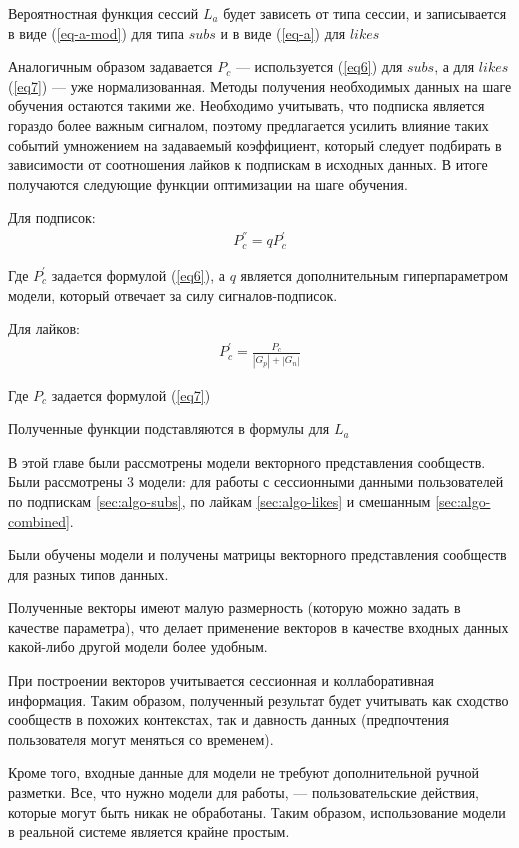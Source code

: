 \documentclass[times,specification,annotation]{itmo-student-thesis}
\begin{document}
Вероятностная функция сессий $L_a$ будет зависеть от типа сессии, и записывается в виде (\ref{eq-a-mod}) для типа $subs$ и в виде (\ref{eq-a}) для $likes$

Аналогичным образом задавается $P_c$ --- используется (\ref{eq6}) для $subs$, а для $likes$ (\ref{eq7}) --- уже нормализованная. Методы получения необходимых данных на шаге обучения остаются такими же. Необходимо учитывать, что подписка является гораздо более важным сигналом, поэтому предлагается усилить влияние таких событий умножением на задаваемый коэффициент, который следует подбирать в зависимости от соотношения лайков к подпискам в исходных данных. В итоге получаются следующие функции оптимизации на шаге обучения.

Для подписок:
\begin{align*}
P^{''}_c = qP^{'}_c
\end{align*}

Где $P^{'}_c$ задаeтся формулой  (\ref{eq6}), а $q$ является дополнительным гиперпараметром модели, который отвечает за силу сигналов-подписок. 

Для лайков:
\begin{align*}
P^{'}_c = \frac{P_c}{|G_p| +|G_n|} 
\end{align*}

Где $P_c$ задается формулой  (\ref{eq7})

Полученные функции подставляются в формулы для $L_a$

\chapterconclusion

В этой главе были рассмотрены модели векторного представления сообществ. Были рассмотрены 3 модели: для работы с сессионными данными пользователей по подпискам \ref{sec:algo-subs}, по лайкам \ref{sec:algo-likes} и смешанным \ref{sec:algo-combined}.

Были обучены модели и получены матрицы векторного представления сообществ для разных типов данных. 

Полученные векторы имеют малую размерность (которую можно задать в качестве параметра), что
делает применение векторов в качестве входных данных какой-либо другой
модели более удобным. 

При построении векторов учитывается сессионная и
коллаборативная информация. Таким образом, полученный результат будет
учитывать как сходство сообществ в похожих контекстах, так и давность данных
(предпочтения пользователя могут меняться со временем). 

Кроме того, входные данные для модели не требуют дополнительной ручной разметки. Все, что нужно модели для работы, --- пользовательские действия, которые могут быть никак не обработаны. Таким образом, использование модели в реальной системе является крайне простым.
\end{document}
